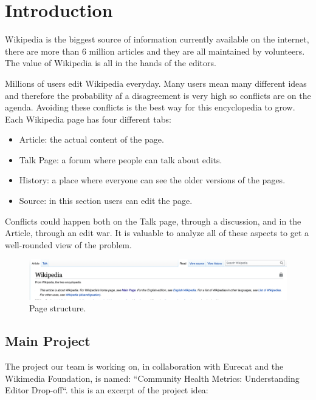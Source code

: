 \chapter{Introduction}
Wikipedia is the biggest source of information currently available on the internet, there are more
than 6 million articles and they are all maintained by volunteers. The value of Wikipedia is all in
the hands of the editors.

Millions of users edit Wikipedia everyday. Many users mean many different ideas and therefore the probability
af a disagreement is very high so conflicts are on the agenda. Avoiding these conflicts is the best way for
this encyclopedia to grow. \\

Each Wikipedia page has four different tabs:  
\begin{itemize}
    \item Article: the actual content of the page.
    \item Talk Page: a forum where people can talk about edits. 
    \item History: a place where everyone can see the older versions of the pages.
    \item Source: in this section users can edit the page. 
\end{itemize}

Conflicts could happen both on the Talk page, through a discussion, and in the Article, through an
edit war. It is valuable to analyze all of these aspects to get a well-rounded view of the problem.

\begin{figure}
    \centering
    \includegraphics[width=1\textwidth]{./chapters/01/assets/wikipedia_page.png}
    \caption{Page structure.}
    \label{fig:page}
\end{figure}

\section{Main Project}
\label{sec:Main Project}
The project our team is working on, in collaboration with Eurecat and the Wikimedia Foundation,
is named: “Community Health Metrics: Understanding Editor Drop-off“. this is an excerpt of the
project idea: \\

